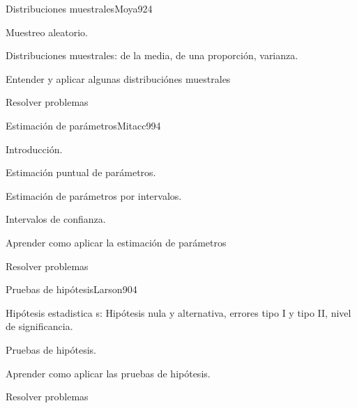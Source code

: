 \begin{syllabus}
\begin{unit}{Distribuciones muestrales}{Moya92}{4}
   \begin{topics}
         \item  Muestreo aleatorio.
	 \item  Distribuciones muestrales: de la media, de una proporción, varianza.
   \end{topics}

   \begin{learningoutcomes}
         \item  Entender y aplicar algunas distribuciónes muestrales
         \item  Resolver problemas
   \end{learningoutcomes}
\end{unit}

\begin{unit}{Estimación de parámetros}{Mitacc99}{4}
   \begin{topics}
         \item  Introducción.
	 \item  Estimación puntual de parámetros.
	\item Estimación de parámetros por intervalos.
	\item Intervalos de confianza.
   \end{topics}

   \begin{learningoutcomes}
         \item  Aprender como aplicar la estimación de parámetros
         \item  Resolver problemas
   \end{learningoutcomes}
\end{unit}

\begin{unit}{Pruebas de hipótesis}{Larson90}{4}
   \begin{topics}
         \item  Hipótesis estadistica s: Hipótesis nula y alternativa, errores tipo I y tipo II, nivel de significancia.
	 \item  Pruebas de hipótesis.
   \end{topics}

   \begin{learningoutcomes}
         \item  Aprender como aplicar las pruebas de hipótesis.
         \item  Resolver problemas
   \end{learningoutcomes}
\end{unit}

\begin{coursebibliography}
\end{coursebibliography}

\end{syllabus}
